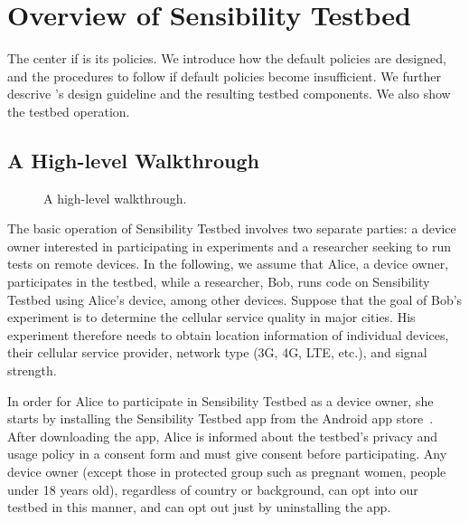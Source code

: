 \section{Overview of Sensibility Testbed}\label{sec-overview}
The center if \sysname is its policies. We introduce how the default
policies are designed, and the procedures to follow if default policies
become insufficient. We further descrive \sysname's design guideline 
and the resulting testbed components. We also show the testbed operation.

\subsection{A High-level Walkthrough}\label{sec-walkthrough}

\begin{figure}
\caption{\small A high-level walkthrough. \label{fig-walkthrough}}
\end{figure}

The basic operation of Sensibility Testbed involves two separate 
parties: a device owner interested in participating in experiments 
and a researcher seeking to run tests on remote devices. In the 
following, we assume that Alice, a device owner, participates in 
the testbed, while a researcher, Bob, runs code on Sensibility Testbed 
using Alice's device, among other
devices. Suppose that the goal of Bob's experiment is to determine the cellular service
quality in major cities. His experiment therefore needs to obtain location information
of individual devices, their cellular service provider, network
type (3G, 4G, LTE, etc.), and signal strength. 

In order for Alice to participate in Sensibility Testbed as a device owner,
she starts by installing the Sensibility Testbed app from 
the Android app store~\cite{sensibility-app}. After downloading the app, 
Alice is informed about the testbed's privacy and usage policy 
in a consent form and must give consent before participating.
Any device owner (except those in protected group such as pregnant women, 
people under 18 years old), regardless of country or background, can 
opt into our testbed in this manner, and can opt out just by 
uninstalling the app. 

